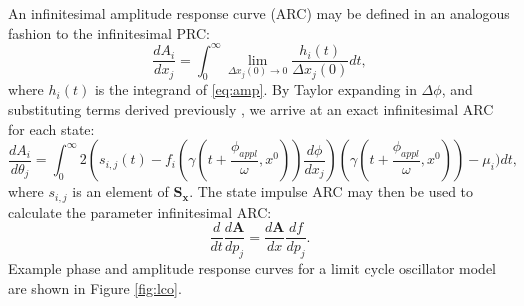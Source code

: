An infinitesimal amplitude response curve (ARC) may be defined in an analogous fashion to the infinitesimal PRC:
\begin{equation}
    \frac{dA_i}{dx_j} = \int_0^\infty \lim_{\Delta x_j(0)\to 0} \frac{h_i(t)}{\Delta x_j(0)} dt,
\end{equation}
where $h_i(t)$ is the integrand of \eqref{eq:amp}.
By Taylor expanding in $\Delta\phi$, and substituting terms derived previously \cite{StJohn2014b}, we arrive at an exact infinitesimal ARC for each state:
\begin{equation}
    \frac{dA_i}{d\theta_j} = \int_0^\infty 2 \left( s_{i,j}(t) -f_i(\gamma(t+\frac{\phi_{appl}}{\omega},x^0))\frac{d\phi}{dx_j}\right)(\gamma(t+\frac{\phi_{appl}}{\omega},x^0))-\mu_i)dt,
\end{equation}
where $s_{i,j}$ is an element of $\mathbf{S_x}$.
The state impulse ARC may then be used to calculate the parameter infinitesimal ARC:
\begin{equation}
    \frac{d}{dt}\frac{d\mathbf{A}}{dp_j} = \frac{d\mathbf{A}}{dx}\frac{df}{dp_j}.
\end{equation}
Example phase and amplitude response curves for a limit cycle oscillator model are shown in Figure \ref{fig:lco}.


